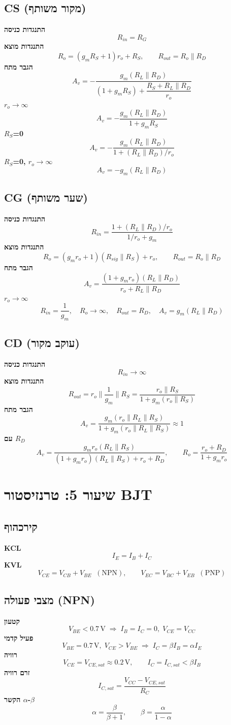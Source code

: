 \documentclass[11pt]{article}
\begin{document}
\subsection*{CS (מקור משותף)}
\textbf{התנגדות כניסה}
\[R_{in}=R_G\]
\textbf{התנגדות מוצא}
\[R_o=\left(g_mR_S+1\right)r_o+R_S,\qquad R_{out}=R_o\parallel R_D\]
\textbf{הגבר מתח}
\[A_v=-\frac{g_m\left(R_L\parallel R_D\right)}{\left(1+g_mR_S\right)+\dfrac{R_S+R_L\parallel R_D}{r_o}}\]
\textbf{$r_{o}$$\to$$\infty$}
\[A_v=-\frac{g_m\left(R_L\parallel R_D\right)}{1+g_mR_S}\]
\textbf{$R_{S}$=0}
\[A_v=-\frac{g_m\left(R_L\parallel R_D\right)}{1+\left(R_L\parallel R_D\right)/r_o}\]
\textbf{$R_{S}$=0, $r_{o}$$\to$$\infty$}
\[A_v=-g_m\left(R_L\parallel R_D\right)\]
\subsection*{CG (שער משותף)}
\textbf{התנגדות כניסה}
\[R_{in}=\frac{1+\left(R_L\parallel R_D\right)/r_o}{1/r_o+g_m}\]
\textbf{התנגדות מוצא}
\[R_o=\left(g_mr_o+1\right)\left(R_{sig}\parallel R_S\right)+r_o,\qquad R_{out}=R_o\parallel R_D\]
\textbf{הגבר מתח}
\[A_v=\frac{\left(1+g_mr_o\right)\left(R_L\parallel R_D\right)}{r_o+R_L\parallel R_D}\]
\textbf{$r_{o}$$\to$$\infty$}
\[R_{in}=\frac{1}{g_m},\quad R_o\to\infty,\quad R_{out}=R_D,\quad A_v=g_m\left(R_L\parallel R_D\right)\]
\subsection*{CD (עוקב מקור)}
\textbf{התנגדות כניסה}
\[R_{in}\to\infty\]
\textbf{התנגדות מוצא}
\[R_{out}=r_o\parallel\frac{1}{g_m}\parallel R_S=\frac{r_o\parallel R_S}{1+g_m\left(r_o\parallel R_S\right)}\]
\textbf{הגבר מתח}
\[A_v=\frac{g_m\left(r_o\parallel R_L\parallel R_S\right)}{1+g_m\left(r_o\parallel R_L\parallel R_S\right)}\approx1\]
\textbf{עם $R_{D}$}
\[A_v=\frac{g_mr_o\left(R_L\parallel R_S\right)}{\left(1+g_mr_o\right)\left(R_L\parallel R_S\right)+r_o+R_D},\qquad R_o=\frac{r_o+R_D}{1+g_mr_o}\]
\section{שיעור 5: טרנזיסטור BJT}
\subsection*{קירכהוף}
\textbf{KCL}
\[I_E=I_B+I_C\]
\textbf{KVL}
\[V_{CE}=V_{CB}+V_{BE}\;\;(\text{NPN}),\qquad V_{EC}=V_{BC}+V_{EB}\;\;(\text{PNP})\]
\subsection*{מצבי פעולה (NPN)}
\textbf{קטעון}
\[V_{BE}<0.7\,\text{V}\;\Rightarrow\;I_B=I_C=0,\;V_{CE}=V_{CC}\]
\textbf{פעיל קדמי}
\[V_{BE}=0.7\,\text{V},\;V_{CE}>V_{BE}\;\Rightarrow\;I_C=\beta I_B=\alpha I_E\]
\textbf{רוויה}
\[V_{CE}=V_{CE,sat}\approx0.2\,\text{V},\qquad I_C=I_{C,sat}<\beta I_B\]
\textbf{זרם רוויה}
\[I_{C,sat}=\frac{V_{CC}-V_{CE,sat}}{R_C}\]
\textbf{הקשר $\alpha$-$\beta$}
\[\alpha=\frac{\beta}{\beta+1},\qquad \beta=\frac{\alpha}{1-\alpha}\]
\end{document}
